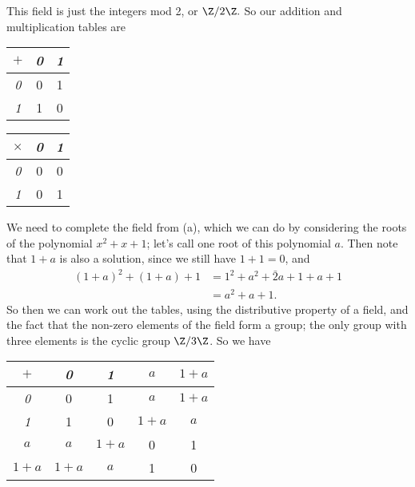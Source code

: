 \documentclass{assignment}
\begin{document}



\begin{qparts}
  \item This field is just the integers mod 2, or $\Z/2\Z.$ So our addition and multiplication tables
    are 
   \begin{center}
    \begin{tabular}{c|c|c}
      $+$ & \emph{0} & \emph{1} \\
      \hline 
      \emph{0} & 0 & 1 \\
      \emph{1} & 1 & 0 \\
    \end{tabular}

    \begin{tabular}{c|c|c}
      $\times$ & \emph{0} & \emph{1} \\
      \hline 
      \emph{0} & 0 & 0 \\
      \emph{1} & 0 & 1 \\
    \end{tabular}
  \end{center}

  \item We need to complete the field from (a), which we can do by considering the roots of the polynomial
    $x^2 + x + 1$; let's call one root of this polynomial $a$. Then note that $1 + a$ is also a solution,
    since we still have $1 + 1 = 0$, and 
    \begin{align*}
      (1 + a)^2 + (1 + a) + 1 &= 1^2 + a^2 + \bar{2}a + 1 + a + 1 \\
                              &= a^2 + a + 1.
    \end{align*}
    So then we can work out the tables, using the distributive property of a field, and the fact that 
    the non-zero elements of the field form a group; the only group with three elements is the cyclic 
    group $\Z/3\Z$. So we have
   \begin{center}
     \begin{tabular}{c|c|c|c|c}
       $+$ & \emph{0} & \emph{1} & \emph{$a$} & \emph{$1+a$} \\
      \hline 
      \emph{0} & 0 & 1 & $a$ & $1+a$ \\
      \emph{1} & 1 & 0 & $1 + a$ & $a$ \\
      \emph{$a$} & $a$ & $1+a$ & 0 & 1 \\
      \emph{$1+a$} & $1+a$ & $a$ & 1 & 0 
    \end{tabular}


\end{center}
\end{qparts}
\end{document}
